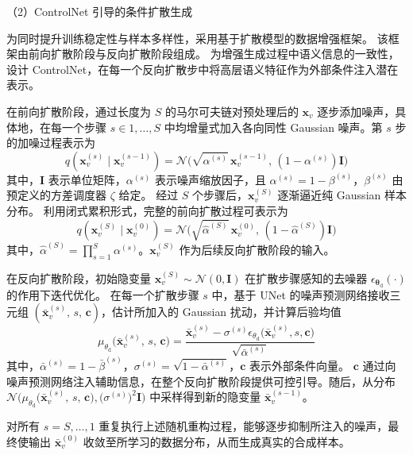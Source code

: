 （2）ControlNet 引导的条件扩散生成

为同时提升训练稳定性与样本多样性，采用基于扩散模型的数据增强框架。
该框架由前向扩散阶段与反向扩散阶段组成。
为增强生成过程中语义信息的一致性，设计 ControlNet，在每一个反向扩散步中将高层语义特征作为外部条件注入潜在表示。

在前向扩散阶段，通过长度为 $S$ 的马尔可夫链对预处理后的 $\bm{x}_v$ 逐步添加噪声，具体地，在每一个步骤 $s \in {1,\dots ,S}$ 中均增量式加入各向同性 Gaussian 噪声。第 $s$ 步的加噪过程表示为
% 
\begin{equation}
q(\bm{x}_v^{(s)} \mid \bm{x}_v^{(s-1)}) = \mathcal{N}\!\bigl(\sqrt{\alpha^{(s)}}\,\bm{x}_v^{(s-1)},\, (1-\alpha^{(s)})\bm{I}\bigr)
\end{equation}
% 
其中，$\bm{I}$ 表示单位矩阵，$\alpha^{(s)}$ 表示噪声缩放因子，且 $\alpha^{(s)} = 1 - \beta^{(s)}$，$\beta^{(s)}$ 由预定义的方差调度器 $\zeta$ 给定。
经过 $S$ 个步骤后，$\bm{x}_v^{(S)}$ 逐渐逼近纯 Gaussian 样本分布。
利用闭式累积形式，完整的前向扩散过程可表示为
% 
\begin{equation}
q(\bm{x}_v^{(S)} \mid \bm{x}_v^{(0)}) = \mathcal{N}\!\bigl(\sqrt{\hat{\alpha}^{(S)}}\,\bm{x}_v^{(0)},\,(1-\hat{\alpha}^{(S)})\bm{I}\bigr)
\end{equation}
% 
其中，$\hat{\alpha}^{(S)} = \prod_{s=1}^{S} {\alpha}^{(s)}$。$\bm{x}_v^{(S)}$ 作为后续反向扩散阶段的输入。

在反向扩散阶段，初始隐变量 $\bm{x}_v^{(S)} \sim \mathcal{N}(0,\bm{I})$ 在扩散步骤感知的去噪器 $\epsilon_{\bm{\theta}_\mathrm{d}}(\cdot)$ 的作用下迭代优化。
在每一个扩散步骤 $s$ 中，基于 UNet 的噪声预测网络接收三元组 $(\bar{\bm{x}}_v^{(s)},\,s,\,\bm{c})$，估计所加入的 Gaussian 扰动，并计算后验均值
% 
\begin{equation}
	\mu_{{\theta}_\mathrm{d}} \bigl(\bar{\bm{x}}_v^{(s)},\,s,\,\bm{c}\bigr)
	= \frac{\bar{\bm{x}}_v^{(s)} - \sigma^{(s)} \epsilon_{{\theta}_\mathrm{d}} \bigl(\bar{\bm{x}}_v^{(s)}, s, \bm{c}\bigr)}
	{\sqrt{\bar{\alpha}^{(s)}}}
\end{equation}
% 
其中，$\bar{\alpha}^{(s)} = 1-\bar{\beta}^{(s)}$，$\sigma^{(s)} = \sqrt{1-\bar{\alpha}^{(s)}}$，$\bm{c}$ 表示外部条件向量。
$\bm{c}$ 通过向噪声预测网络注入辅助信息，在整个反向扩散阶段提供可控引导。随后，从分布 $\mathcal{N} \bigl(\mu_{{\theta}_\mathrm{d}} \bigl(\bar{\bm{x}}_v^{(s)},\,s,\,\bm{c}\bigr), \bigl(\sigma^{(s)}\bigr)^{2}\bm{I}\bigr)$ 中采样得到新的隐变量 $\bar{\bm{x}}_v^{(s-1)}$。

对所有 $s = S,\ldots,1$ 重复执行上述随机重构过程，能够逐步抑制所注入的噪声，最终使输出 $\bar{\bm{x}}_v^{(0)}$ 收敛至所学习的数据分布，从而生成真实的合成样本。

